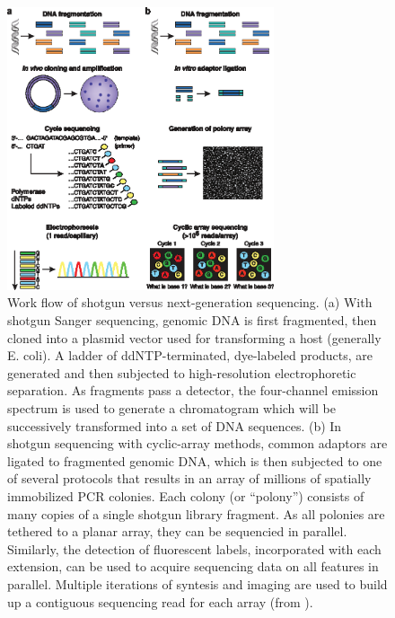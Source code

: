 \begin{figure}[!tb]
	\centering
	\includegraphics[width=0.7\textwidth]{./figures/Introduction/seq_approaches}
  	\caption{Work flow of shotgun versus next-generation sequencing. (a) With shotgun Sanger sequencing, genomic DNA is first fragmented, then cloned into a plasmid vector used for transforming a host (generally E. coli). A ladder of ddNTP-terminated, dye-labeled products, are generated and then subjected to high-resolution electrophoretic separation. As fragments pass a detector, the four-channel emission spectrum is used to generate a chromatogram which will be successively transformed into a set of DNA sequences. (b) In shotgun sequencing with cyclic-array methods, common adaptors are ligated to fragmented genomic DNA, which is then subjected to one of several protocols that results in an array of millions of spatially immobilized PCR colonies. Each colony (or ``polony'') consists of many copies of a single shotgun library fragment. As all polonies are tethered to a planar array, they can be sequencied in parallel. Similarly, the detection of fluorescent labels, incorporated with each extension, can be used to acquire sequencing data on all features in parallel. Multiple iterations of syntesis and imaging are used to build up a contiguous sequencing read for each array (from \cite{shendure2008next}). \label{fig:seqappr}}
\end{figure}%
